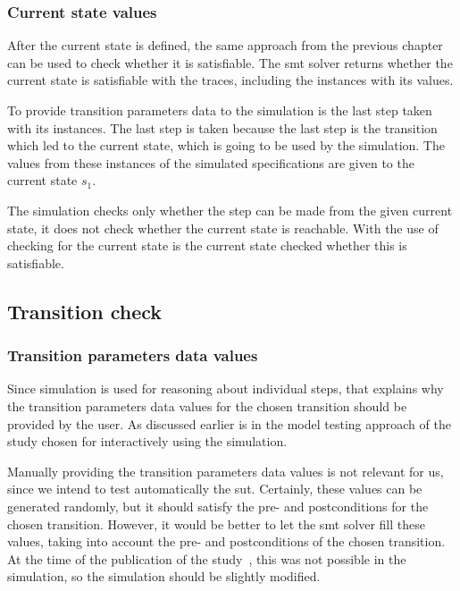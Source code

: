 \subsubsection*{Current state values}
After the current state is defined, the same approach from the previous chapter
can be used to check whether it is satisfiable. The \gls{smt} solver returns whether the
current state is satisfiable with the traces, including the instances with its
values.

To provide transition parameters data to the simulation is the last step taken
with its instances. The last step is taken because the last step is the
transition which led to the current state, which is going to be used by the
simulation. The values from these instances of the simulated specifications are
given to the current state $s_{1}$.

The simulation checks only whether the step can be made from the given current
state, it does not check whether the current state is reachable. With the use of
checking for the current state is the current state checked whether this is
satisfiable.

\subsection{Transition check}

\subsubsection*{Transition parameters data values}
Since simulation is used for reasoning about individual steps, that explains why
the transition parameters data values for the chosen transition should be
provided by the user. As discussed earlier is in the model testing approach
of the study \cite[p.~6]{stoel_storm_vinju_bosman_2016} chosen for interactively
using the simulation.

Manually providing the transition parameters data values
is not relevant for us, since we intend to test automatically the \gls{sut}.
Certainly, these values can be generated randomly, but it should satisfy the
pre- and postconditions for the chosen transition. However, it would be
better to let the \gls{smt} solver fill these values, taking into account the pre- and
postconditions of the chosen transition. At the time of the publication of the
study~\cite{stoel_storm_vinju_bosman_2016}, this was not possible in the simulation, so
the simulation should be slightly modified.

